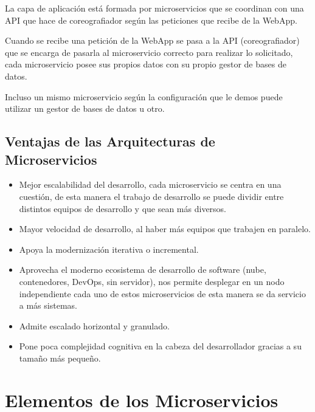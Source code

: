\documentclass[12pt]{report} %
\begin{document}
La capa de aplicación está formada por microservicios que se coordinan con una API que hace de coreografiador según las peticiones que recibe de la WebApp.

Cuando se recibe una petición de la WebApp se pasa a la API (coreografiador) que se encarga de pasarla al microservicio correcto para realizar lo solicitado, cada microservicio posee sus propios datos con su propio gestor de bases de datos. 

Incluso un mismo microservicio según la configuración que le demos puede utilizar un gestor de bases de datos u otro.

\subsection{Ventajas de las Arquitecturas de Microservicios}
\begin{itemize}
	\item	Mejor escalabilidad del desarrollo, cada microservicio se centra en una cuestión, de esta manera el trabajo de desarrollo se puede dividir entre distintos equipos de desarrollo y que sean más diversos.
	\item	Mayor velocidad de desarrollo, al haber más equipos que trabajen en paralelo.
	\item	Apoya la modernización iterativa o incremental.
	\item	Aprovecha el moderno ecosistema de desarrollo de software (nube, contenedores, DevOps, sin servidor), nos permite desplegar en un nodo independiente cada uno de estos microservicios de esta manera se da servicio a más sistemas.
	\item	Admite escalado horizontal y granulado.
	\item	Pone poca complejidad cognitiva en la cabeza del desarrollador gracias a su tamaño más pequeño.
\end{itemize}

\section{Elementos de los Microservicios}
\end{document}
